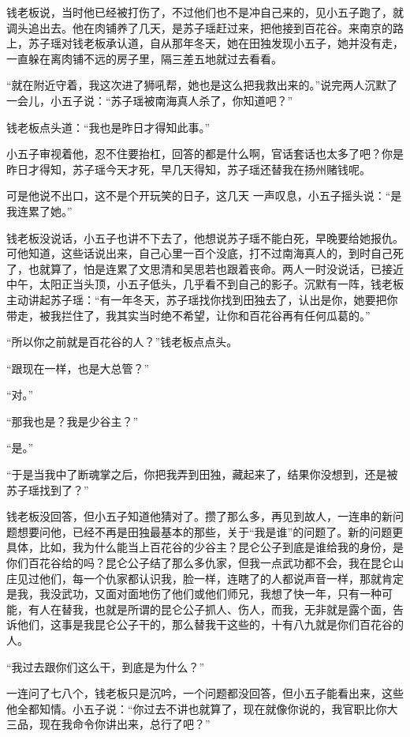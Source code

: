 钱老板说，当时他已经被打伤了，不过他们也不是冲自己来的，见小五子跑了，就调头追出去。他在肉铺养了几天，是苏子瑶赶过来，把他接到百花谷。来南京的路上，苏子瑶对钱老板承认道，自从那年冬天，她在田独发现小五子，她并没有走，一直躲在离肉铺不远的房子里，隔三差五地就过去看看。

“就在附近守着，我这次进了狮吼帮，她也是这么把我救出来的。”说完两人沉默了一会儿，小五子说：“苏子瑶被南海真人杀了，你知道吧？”

钱老板点头道：“我也是昨日才得知此事。”

小五子审视着他，忍不住要抬杠，回答的都是什么啊，官话套话也太多了吧？你是昨日才得知，苏子瑶今天才死，早几天得知，苏子瑶还替我在扬州赌钱呢。

可是他说不出口，这不是个开玩笑的日子，这几天
一声叹息，小五子摇头说：“是我连累了她。”

钱老板没说话，小五子也讲不下去了，他想说苏子瑶不能白死，早晚要给她报仇。可他知道，这些话说出来，自己心里一百个没底，打不过南海真人的，到时自己死了，也就算了，怕是连累了文思清和吴思若也跟着丧命。两人一时没说话，已接近中午，太阳正当头顶，小五子低头，几乎看不到自己的影子。沉默有一阵，钱老板主动讲起苏子瑶：“有一年冬天，苏子瑶找你找到田独去了，认出是你，她要把你带走，被我拦住了，我其实当时绝不希望，让你和百花谷再有任何瓜葛的。”

“所以你之前就是百花谷的人？”钱老板点点头。

“跟现在一样，也是大总管？”

“对。”

“那我也是？我是少谷主？”

“是。”

“于是当我中了断魂掌之后，你把我弄到田独，藏起来了，结果你没想到，还是被苏子瑶找到了？”

钱老板没回答，但小五子知道他猜对了。攒了那么多，再见到故人，一连串的新问题想要问他，已经不再是田独最基本的那些，关于“我是谁”的问题了。新的问题更具体，比如，我为什么能当上百花谷的少谷主？昆仑公子到底是谁给我的身份，是你们百花谷给的吗？昆仑公子结了那么多仇家，但我一点武功都不会，我在昆仑山庄见过他们，每一个仇家都认识我，脸一样，连瞎了的人都说声音一样，那就肯定是我，我没武功，又面对面地伤了他们或他们师兄，我想了快一年，只有一种可能，有人在替我，也就是所谓的昆仑公子抓人、伤人，而我，无非就是露个面，告诉他们，这事是我昆仑公子干的，那么替我干这些的，十有八九就是你们百花谷的人。

“我过去跟你们这么干，到底是为什么？”

一连问了七八个，钱老板只是沉吟，一个问题都没回答，但小五子能看出来，这些他全都知情。小五子说：“你过去不讲也就算了，现在就像你说的，我官职比你大三品，现在我命令你讲出来，总行了吧？”

